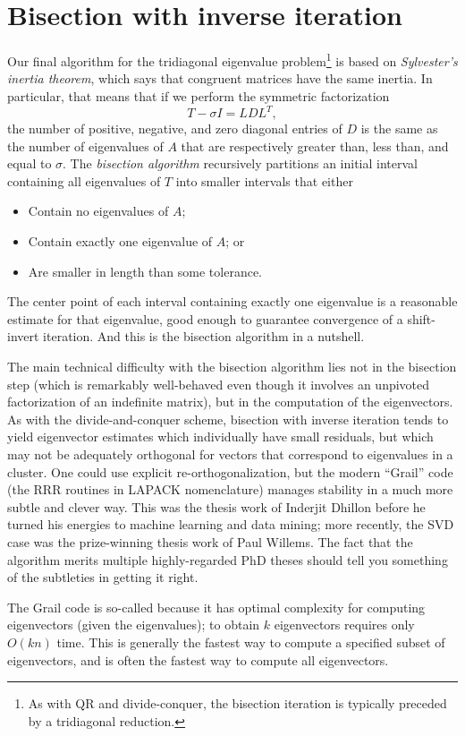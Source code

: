 \section{Bisection with inverse iteration}

Our final algorithm for the tridiagonal eigenvalue problem\footnote{%
As with QR and divide-conquer, the bisection iteration is typically
preceded by a tridiagonal reduction.
} is based on {\em Sylvester's inertia theorem},
which says that congruent matrices have the same inertia.
In particular, that means that if we perform the symmetric
factorization
\[
  T - \sigma I = L D L^T,
\]
the number of positive, negative, and zero diagonal entries of $D$
is the same as the number of eigenvalues of $A$ that are respectively
greater than, less than, and equal to $\sigma$.  The {\em bisection
algorithm} recursively partitions an initial interval containing all
eigenvalues of $T$ into smaller intervals that either
\begin{itemize}
\item Contain no eigenvalues of $A$;
\item Contain exactly one eigenvalue of $A$; or
\item Are smaller in length than some tolerance.
\end{itemize}
The center point of each interval containing exactly one eigenvalue is
a reasonable estimate for that eigenvalue, good enough to guarantee
convergence of a shift-invert iteration.  And this is the bisection
algorithm in a nutshell.

The main technical difficulty with the bisection algorithm lies not
in the bisection step (which is remarkably well-behaved even though
it involves an unpivoted factorization of an indefinite matrix),
but in the computation of the eigenvectors.  As with the divide-and-conquer
scheme, bisection with inverse iteration tends to yield eigenvector
estimates which individually have small residuals, but which may not be
adequately orthogonal for vectors that correspond to eigenvalues in a
cluster.  One could use explicit re-orthogonalization, but the modern
``Grail'' code (the RRR routines in LAPACK nomenclature) manages
stability in a much more subtle and clever way.
This was the thesis work of Inderjit Dhillon before he turned his
energies to machine learning and data mining; more recently, the SVD
case was the prize-winning thesis work of Paul Willems.  The fact that
the algorithm merits multiple highly-regarded PhD theses should tell
you something of the subtleties in getting it right.

The Grail code is so-called because it has optimal complexity for
computing eigenvectors (given the eigenvalues); to obtain $k$ eigenvectors
requires only $O(kn)$ time.  This is generally the fastest way to
compute a specified subset of eigenvectors, and is often the fastest
way to compute all eigenvectors.
